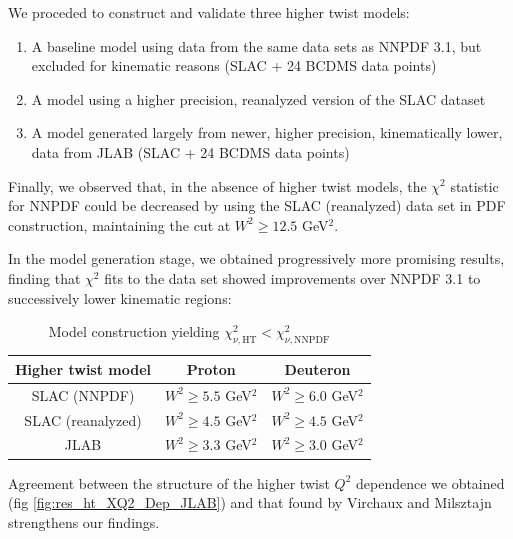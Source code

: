 \documentclass[12pt,a4paper]{report}
\begin{document}
We proceded to construct and validate three higher twist models:
\begin{enumerate}
\item A baseline model using data from the same data sets as NNPDF 3.1, but excluded for kinematic reasons (SLAC + 24 BCDMS data points)
\item A model using a higher precision, reanalyzed version of the SLAC \cite{Whitlow} dataset
\item A model generated largely from newer, higher precision, kinematically lower, data from JLAB (SLAC + 24 BCDMS data points)
\end{enumerate}

Finally, we observed that, in the absence of higher twist models, the $\chi^2$ statistic for NNPDF could be decreased by using the SLAC (reanalyzed) data set in PDF construction, maintaining the cut at $W^2 \ge 12.5$ GeV$^2$.

In the model generation stage, we obtained progressively more promising results, finding that $\chi^2$ fits to the data set showed improvements over NNPDF 3.1 to successively lower kinematic regions:
\begin{table}[H]
\begin{center}
\begin{tabular}{|c|c|c|}
\hline
Higher twist model & Proton & Deuteron\\
\hline
SLAC (NNPDF)  & $W^2 \ge 5.5$ GeV$^2$ & $W^2 \ge 6.0$ GeV$^2$\\
SLAC (reanalyzed) & $W^2 \ge 4.5$ GeV$^2$ & $W^2 \ge 4.5$ GeV$^2$\\
JLAB & $W^2 \ge 3.3$ GeV$^2$ & $W^2 \ge 3.0$ GeV$^2$\\
\hline
\end{tabular}
\caption{Model construction yielding $\chi_{\nu,\textrm{HT}}^2 < \chi_{\nu,\textrm{NNPDF}}^2$}
\label{tb:results_model_create_summary}
\end{center}
\end{table}
Agreement between the structure of the higher twist $Q^2$ dependence we obtained (fig \ref{fig:res_ht_XQ2_Dep_JLAB}) and that found by Virchaux and Milsztajn \cite[pg 223]{Virchaux} strengthens our findings.
\end{document}
